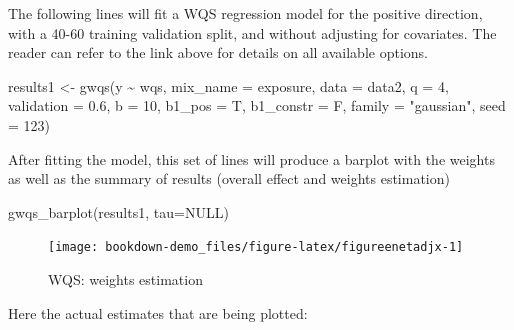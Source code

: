 \documentclass[
]{book}
\newenvironment{Shaded}{\begin{snugshade}}{\end{snugshade}}
\newcommand{\AttributeTok}[1]{\textcolor[rgb]{0.77,0.63,0.00}{#1}}
\newcommand{\ConstantTok}[1]{\textcolor[rgb]{0.00,0.00,0.00}{#1}}
\newcommand{\DecValTok}[1]{\textcolor[rgb]{0.00,0.00,0.81}{#1}}
\newcommand{\FloatTok}[1]{\textcolor[rgb]{0.00,0.00,0.81}{#1}}
\newcommand{\FunctionTok}[1]{\textcolor[rgb]{0.00,0.00,0.00}{#1}}
\newcommand{\NormalTok}[1]{#1}
\newcommand{\OtherTok}[1]{\textcolor[rgb]{0.56,0.35,0.01}{#1}}
\newcommand{\SpecialCharTok}[1]{\textcolor[rgb]{0.00,0.00,0.00}{#1}}
\newcommand{\StringTok}[1]{\textcolor[rgb]{0.31,0.60,0.02}{#1}}
\begin{document}
The following lines will fit a WQS regression model for the positive direction, with a 40-60 training validation split, and without adjusting for covariates. The reader can refer to the link above for details on all available options.

\begin{Shaded}
\begin{Highlighting}[]
\NormalTok{results1 }\OtherTok{\textless{}{-}} \FunctionTok{gwqs}\NormalTok{(y }\SpecialCharTok{\textasciitilde{}}\NormalTok{ wqs, }\AttributeTok{mix\_name =}\NormalTok{ exposure, }\AttributeTok{data =}\NormalTok{ data2, }\AttributeTok{q =} \DecValTok{4}\NormalTok{, }\AttributeTok{validation =} \FloatTok{0.6}\NormalTok{,}
                \AttributeTok{b =} \DecValTok{10}\NormalTok{, }\AttributeTok{b1\_pos =}\NormalTok{ T, }\AttributeTok{b1\_constr =}\NormalTok{ F, }\AttributeTok{family =} \StringTok{"gaussian"}\NormalTok{, }
                \AttributeTok{seed =} \DecValTok{123}\NormalTok{)}
\end{Highlighting}
\end{Shaded}

After fitting the model, this set of lines will produce a barplot with the weights as well as the summary of results (overall effect and weights estimation)

\begin{Shaded}
\begin{Highlighting}[]
\FunctionTok{gwqs\_barplot}\NormalTok{(results1, }\AttributeTok{tau=}\ConstantTok{NULL}\NormalTok{)}
\end{Highlighting}
\end{Shaded}

\begin{figure}[H]

{\centering \texttt{[image: bookdown-demo\_files/figure-latex/figureenetadjx-1]} 

}

\caption{WQS: weights estimation}\label{fig:figureenetadjx}
\end{figure}

Here the actual estimates that are being plotted:
\end{document}
